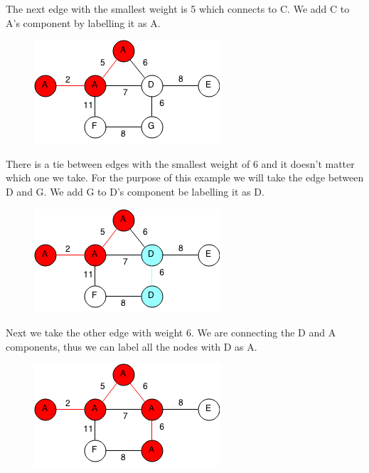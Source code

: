 \documentclass[11pt,oneside]{book}
\makeatletter
\def\maxwidth#1{\ifdim\Gin@nat@width>#1 #1\else\Gin@nat@width\fi}
\makeatother
\begin{document}
The next edge with the smallest weight is 5 which connects to C. We add C to A's component by labelling it as A.

\vspace{5px}\begin{figure}[H]\centering
        \includegraphics[width=0.66\maxwidth{\textwidth}]{kruskal3.png}
        \end{figure}

There is a tie between edges with the smallest weight of 6 and it doesn't matter which one we take. For the purpose of this example we will take the edge between D and G. We add G to D's component be labelling it as D.

\vspace{5px}\begin{figure}[H]\centering
        \includegraphics[width=0.66\maxwidth{\textwidth}]{kruskal4.png}
        \end{figure}

Next we take the other edge with weight 6. We are connecting the D and A components, thus we can label all the nodes with D as A.

\vspace{5px}\begin{figure}[H]\centering
        \includegraphics[width=0.66\maxwidth{\textwidth}]{kruskal5.png}
        \end{figure}
\end{document}
